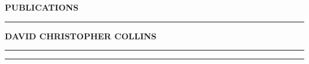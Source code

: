 \documentclass[10pt]{article}
\begin{document}
\noindent
{\bf\large PUBLICATIONS}\rule[3.5pt]{152.75pt}{.3mm}{\bf\large DAVID CHRISTOPHER COLLINS}

\noindent
\rule[9pt]{6.5in}{.3mm}

\bigskip

%
\bigskip

\noindent
\rule[9pt]{\textwidth}{.3mm}
\end{document}
